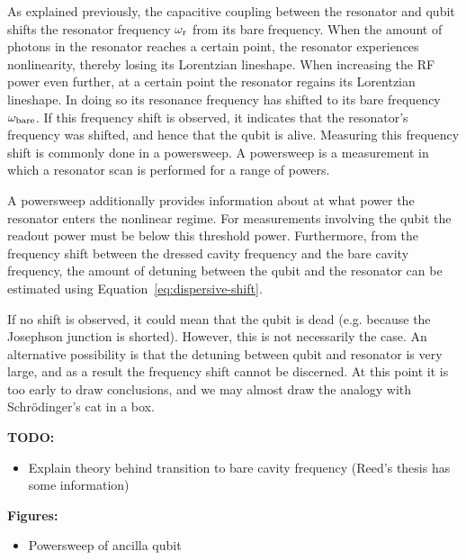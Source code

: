         As explained previously, the capacitive coupling between the resonator and qubit shifts the resonator frequency $\omega_\text{r}$ from its bare frequency. When the amount of photons in the resonator reaches a certain point, the resonator experiences nonlinearity, thereby losing its Lorentzian lineshape. When increasing the RF power even further, at a certain point the resonator regains its Lorentzian lineshape. In doing so its resonance frequency has shifted to its bare frequency $\omega_\text{bare}$. If this frequency shift is observed, it indicates that the resonator's frequency was shifted, and hence that the qubit is alive. Measuring this frequency shift is commonly done in a powersweep. A powersweep is a measurement in which a resonator scan is performed for a range of powers.

        A powersweep additionally provides information about at what power the resonator enters the nonlinear regime. For measurements involving the qubit the readout power must be below this threshold power. Furthermore, from the frequency shift between the dressed cavity frequency and the bare cavity frequency, the amount of detuning between the qubit and the resonator can be estimated using Equation~\ref{eq:dispersive-shift}.

        If no shift is observed, it could mean that the qubit is dead (e.g. because the Josephson junction is shorted). However, this is not necessarily the case. An alternative possibility is that the detuning between qubit and resonator is very large, and as a result the frequency shift cannot be discerned. At this point it is too early to draw conclusions, and we may almost draw the analogy with Schr\"odinger's cat in a box.

        \textbf{TODO:}
        \begin{itemize}
          \item Explain theory behind transition to bare cavity frequency (Reed's thesis has some information)
        \end{itemize}

        \textbf{Figures:}
        \begin{itemize}
          \item Powersweep of ancilla qubit
        \end{itemize}

